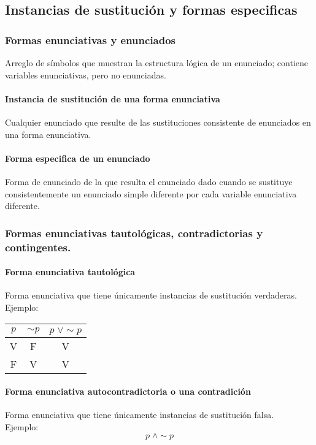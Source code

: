 \documentclass[10pt]{book} 						%
\begin{document}
\subsection{Instancias de sustitución y formas especificas}
\subsubsection{Formas enunciativas y enunciados}
Arreglo de símbolos que muestran la estructura lógica de un enunciado; contiene variables enunciativas, pero no enunciadas.
\paragraph{Instancia de sustitución de una forma enunciativa}
Cualquier enunciado que resulte de las sustituciones consistente de enunciados en una forma enunciativa.
\paragraph{Forma especifica de un enunciado}
Forma de enunciado de la que resulta el enunciado dado cuando se sustituye consistentemente un enunciado simple diferente por cada variable enunciativa diferente.
\subsubsection{Formas enunciativas tautológicas, contradictorias y contingentes.}
\paragraph{Forma enunciativa tautológica} Forma enunciativa que tiene únicamente instancias de sustitución verdaderas.\\
Ejemplo:
\begin{center}
\begin{tabular}{c c c}
$p$&$\sim p$&$p \; \lor \sim p$\\
\hline
V&F&V\\
F&V&V\\
\end{tabular}
\end{center}

\paragraph{Forma enunciativa autocontradictoria o una contradición}
Forma enunciativa que tiene únicamente instancias de sustitución falsa.\\
Ejemplo:
$$ p \; \land \sim p $$
\end{document}
